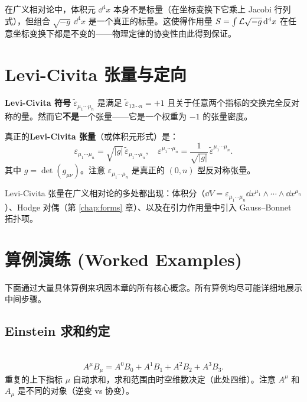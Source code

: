 \begin{remark}
在广义相对论中，体积元 $\dd^4 x$ 本身不是标量（在坐标变换下它乘上 Jacobi 行列式），但组合 $\sqrt{-g} \, \dd^4 x$ 是一个真正的标量。这使得作用量 $S = \int \mathcal{L} \sqrt{-g} \, \dd^4 x$ 在任意坐标变换下都是不变的——物理定律的协变性由此得到保证。
\end{remark}

\section{Levi-Civita 张量与定向}

\begin{definition}
\textbf{Levi-Civita 符号} $\tilde{\varepsilon}_{\mu_1\cdots\mu_n}$ 是满足 $\tilde{\varepsilon}_{12\cdots n} = +1$ 且关于任意两个指标的交换完全反对称的量。然而它\textbf{不是}一个张量——它是一个权重为 $-1$ 的张量密度。

真正的\textbf{Levi-Civita 张量}（或体积元形式）是：
\begin{equation}
    \varepsilon_{\mu_1\cdots\mu_n} = \sqrt{|g|} \, \tilde{\varepsilon}_{\mu_1\cdots\mu_n}, \quad
    \varepsilon^{\mu_1\cdots\mu_n} = \frac{1}{\sqrt{|g|}} \, \tilde{\varepsilon}^{\mu_1\cdots\mu_n}.
\end{equation}
其中 $g = \det(g_{\mu\nu})$。注意 $\varepsilon_{\mu_1\cdots\mu_n}$ 是真正的 $(0,n)$ 型反对称张量。
\end{definition}

Levi-Civita 张量在广义相对论的多处都出现：体积分（$\dd V = \varepsilon_{\mu_1\cdots\mu_n} \dd x^{\mu_1} \wedge \cdots \wedge \dd x^{\mu_n}$）、Hodge 对偶（第 \ref{chap:forms} 章）、以及在引力作用量中引入 Gauss--Bonnet 拓扑项。

\section{算例演练 (Worked Examples)}

下面通过大量具体算例来巩固本章的所有核心概念。所有算例均尽可能详细地展示中间步骤。

\subsection{Einstein 求和约定}

\
\begin{equation}
    A^\mu B_\mu = A^0 B_0 + A^1 B_1 + A^2 B_2 + A^3 B_3.
\end{equation}
重复的上下指标 $\mu$ 自动求和，求和范围由时空维数决定（此处四维）。注意 $A^\mu$ 和 $A_\mu$ 是不同的对象（逆变 vs 协变）。

